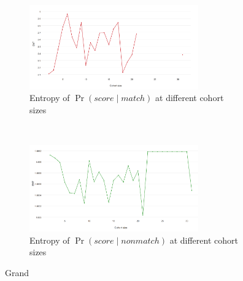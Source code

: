 \begin{figure}[htbp]
    \centering
    \begin{subfigure}[t]{\textwidth}
        \centering
        \includegraphics[width=0.8\textwidth]{dataset/grand/ent_psm}
        \caption{Entropy of $\Pr{(score \mid match)}$ at different cohort sizes}
        \label{fig:grand_ent_psm} %
    \end{subfigure}%
    \\
    \begin{subfigure}[t]{\textwidth}
        \centering
        \includegraphics[width=0.8\textwidth]{dataset/grand/ent_psnm}
        \caption{Entropy of $\Pr{(score \mid nonmatch)}$ at different cohort 
        sizes}
        \label{fig:grand_ent_psnm} %
    \end{subfigure}%
    \caption{Grand}
    \label{fig:grand_entemd} %
\end{figure}

